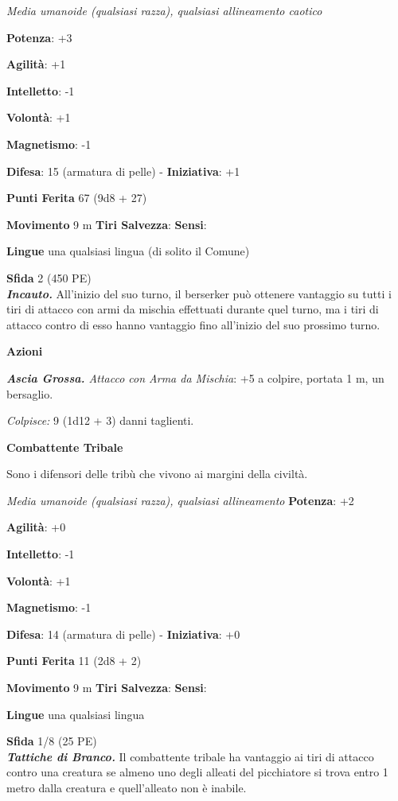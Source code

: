 \begin{multicols}{2}
\emph{Media umanoide (qualsiasi razza), qualsiasi allineamento caotico}

\textbf{Potenza}: +3

\textbf{Agilità}: +1

\textbf{Intelletto}: -1

\textbf{Volontà}: +1

\textbf{Magnetismo}: -1

\textbf{Difesa}: 15 (armatura di pelle) - \textbf{Iniziativa}: +1

\textbf{Punti Ferita} 67 (9d8 + 27)

\textbf{Movimento} 9 m
\textbf{Tiri Salvezza}:
\textbf{Sensi}: 

\textbf{Lingue} una qualsiasi lingua (di solito il Comune)

\textbf{Sfida} 2 (450 PE)\smallskip\\

\emph{\textbf{Incauto.}} All'inizio del suo turno, il berserker può
ottenere vantaggio su tutti i tiri di attacco con armi da mischia
effettuati durante quel turno, ma i tiri di attacco contro di esso hanno
vantaggio fino all'inizio del suo prossimo turno.

\smallskip\textbf{Azioni}

\emph{\textbf{Ascia Grossa.} Attacco con Arma da Mischia}: +5 a colpire,
portata 1 m, un bersaglio.

\emph{Colpisce:} 9 (1d12 + 3) danni taglienti.

\textbf{Combattente Tribale}

Sono i difensori delle tribù che vivono ai margini della civiltà.

\emph{Media umanoide (qualsiasi razza), qualsiasi allineamento}
\textbf{Potenza}: +2

\textbf{Agilità}: +0

\textbf{Intelletto}: -1

\textbf{Volontà}: +1

\textbf{Magnetismo}: -1

\textbf{Difesa}: 14 (armatura di pelle) - \textbf{Iniziativa}: +0

\textbf{Punti Ferita} 11 (2d8 + 2)

\textbf{Movimento} 9 m
\textbf{Tiri Salvezza}:
\textbf{Sensi}: 

\textbf{Lingue} una qualsiasi lingua

\textbf{Sfida} 1/8 (25 PE)\smallskip\\

\emph{\textbf{Tattiche di Branco.}} Il combattente tribale ha vantaggio
ai tiri di attacco contro una creatura se almeno uno degli alleati del
picchiatore si trova entro 1 metro dalla creatura e quell'alleato non
è inabile.


\end{multicols}
